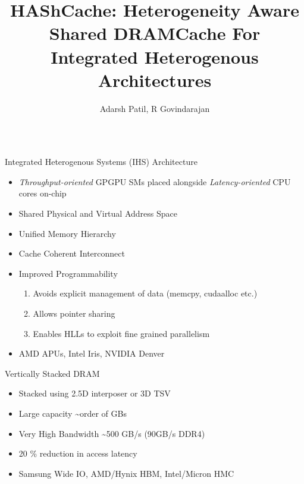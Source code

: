 \documentclass[final,t]{beamer}
\title{\LARGE HAShCache: Heterogeneity Aware Shared DRAMCache For Integrated Heterogenous Architectures}
\author{Adarsh Patil, R Govindarajan}
\institute{Department of CSA, Indian Institute of Science, Bangalore }
\begin{document}


\begin{frame}[t,fragile]{}
\begin{columns}[t]

\begin{column}{.47\linewidth}

    \begin{exampleblock}{Integrated Heterogenous Systems (IHS) Architecture}
    \begin{itemize}
    	\item \textit{Throughput-oriented} GPGPU SMs placed alongside \textit{Latency-oriented} CPU cores on-chip
   		\item Shared Physical and Virtual Address Space
		\item Unified Memory Hierarchy
		\item Cache Coherent Interconnect
    	\item Improved Programmability
    	\begin{enumerate}
	    	\item Avoids explicit management of data (memcpy, cudaalloc etc.)
	    	\item Allows pointer sharing
	    	\item Enables HLLs to exploit fine grained parallelism
    	\end{enumerate}
		\item AMD APUs, Intel Iris, NVIDIA Denver
    \end{itemize}
    \end{exampleblock}
    \begin{exampleblock}{Vertically Stacked DRAM}
    \begin{itemize}
        	\item Stacked using 2.5D interposer or 3D TSV
       		\item Large capacity \textasciitilde order of GBs
    		\item Very High Bandwidth \textasciitilde 500 GB/s (90GB/s DDR4)
    		\item 20 \% reduction in access latency
        	\item Samsung Wide IO, AMD/Hynix HBM, Intel/Micron HMC

\end{itemize}
\end{exampleblock}
\end{column}
\end{columns}
\end{frame}
\end{document}
